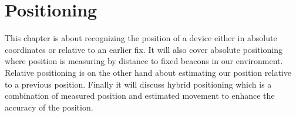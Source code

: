 \chapter{Positioning} \label{ch:positioning}

This chapter is about recognizing the position of a device either in absolute coordinates or relative to an earlier fix. It will also cover absolute positioning where position is measuring by distance to fixed beacons in our environment. Relative positioning is on the other hand about estimating our position relative to a previous position. Finally it will discuss hybrid positioning which is a combination of measured position and estimated movement to enhance the accuracy of the position.




